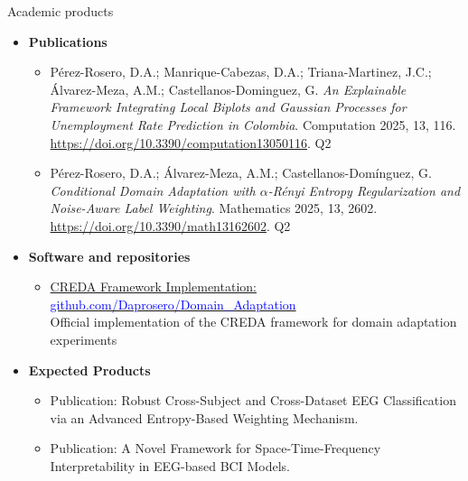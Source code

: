 \documentclass[aspectratio=169]{beamer}
\begin{document}
\begin{frame}{Academic products}
\footnotesize
    \begin{itemize}
    
        \item \textbf{Publications}
        \begin{itemize}
        \footnotesize
            \item Pérez-Rosero, D.A.; Manrique-Cabezas, D.A.; Triana-Martinez, J.C.; Álvarez-Meza, A.M.; Castellanos-Dominguez, G. 
            \textit{An Explainable Framework Integrating Local Biplots and Gaussian Processes for Unemployment Rate Prediction in Colombia}. 
            Computation 2025, 13, 116. 
            \href{https://doi.org/10.3390/computation13050116}{https://doi.org/10.3390/computation13050116}. Q2
            \item Pérez-Rosero, D.A.; Álvarez-Meza, A.M.; Castellanos-Domínguez, G. 
            \textit{Conditional Domain Adaptation with $\alpha$-R{\'e}nyi Entropy Regularization and Noise-Aware Label Weighting}. 
            Mathematics 2025, 13, 2602. 
            \href{https://doi.org/10.3390/math13162602}{https://doi.org/10.3390/math13162602}. Q2

        \end{itemize}
        
        \item \textbf{Software and repositories}
        \begin{itemize}
        \footnotesize
            \item \href{https://github.com/Daprosero/Domain_Adaptation}{CREDA Framework Implementation: \textcolor{blue}{github.com/Daprosero/Domain\_Adaptation}}\\
            Official implementation of the CREDA framework for domain adaptation experiments
        \end{itemize}
    \item \textbf{Expected Products}
        \begin{itemize}
        \footnotesize
            \item Publication: Robust Cross-Subject and Cross-Dataset EEG Classification via an Advanced Entropy-Based Weighting Mechanism. 
            \item Publication: A Novel Framework for Space-Time-Frequency Interpretability in EEG-based BCI Models.
        \end{itemize}
    \end{itemize}
\end{frame}
\end{document}
